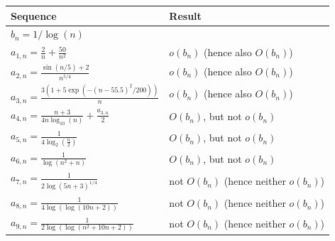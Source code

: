 \documentclass[
  letterpaper,
  DIV=11,
  numbers=noendperiod]{scrreprt}
\theoremstyle{definition}
\theoremstyle{plain}
\theoremstyle{plain}
\theoremstyle{definition}
\theoremstyle{plain}
\theoremstyle{definition}
\theoremstyle{remark}
\begin{document}
\begin{longtable}[]{@{}
  >{\raggedright\arraybackslash}p{}
  >{\raggedright\arraybackslash}p{}@{}}
\toprule\noalign{}
\begin{minipage}[b]{\linewidth}\raggedright
Sequence
\end{minipage} & \begin{minipage}[b]{\linewidth}\raggedright
Result
\end{minipage} \\
\midrule\noalign{}
\endhead
\bottomrule\noalign{}
\endlastfoot
\(b_n = 1/\log (n)\) & \\
\(a_{1,n}=\frac{2}{n}+\frac{50}{n^2}\) & \(o(b_n)\) (hence also
\(O(b_n)\)) \\
\(a_{2,n}=\frac{\sin (n/5)+2}{n^{5/4}}\) & \(o(b_n)\) (hence also
\(O(b_n)\)) \\
\(a_{3,n}=\frac{3(1+5\exp(-(n-55.5)^2/200))}{n}\) & \(o(b_n)\) (hence
also \(O(b_n)\)) \\
\(a_{4,n}=\frac{n+3}{4n\log_{10}(n)}+\frac{a_{3,n}}{2}\) & \(O(b_n)\),
but not \(o(b_n)\) \\
\(a_{5,n}=\frac{1}{4\log_{2} (\frac{n}{2})}\) & \(O(b_n)\), but not
\(o(b_n)\) \\
\(a_{6,n}=\frac{1}{\log (n^2+n)}\) & \(O(b_n)\), but not \(o(b_n)\) \\
\(a_{7,n}=\frac{1}{2\log(5n+3)^{1/4}}\) & not \(O(b_n)\) (hence neither
\(o(b_n)\)) \\
\(a_{8,n}=\frac{1}{4\log(\log (10n+2))}\) & not \(O(b_n)\) (hence
neither \(o(b_n)\)) \\
\(a_{9,n}=\frac{1}{2\log(\log (n^2+10n+2))}\) & not \(O(b_n)\) (hence
neither \(o(b_n)\)) \\
\end{longtable}
\end{document}
